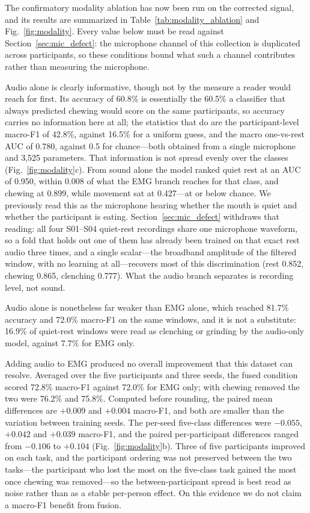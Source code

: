 \documentclass[pdflatex,sn-nature,iicol]{sn-jnl}
\begin{document}
The confirmatory modality ablation has now been run on the corrected signal, and its results are summarized in Table~\ref{tab:modality_ablation} and Fig.~\ref{fig:modality}. Every value below must be read against Section~\ref{sec:mic_defect}: the microphone channel of this collection is duplicated across participants, so these conditions bound what such a channel contributes rather than measuring the microphone.

Audio alone is clearly informative, though not by the measure a reader would reach for first. Its accuracy of 60.8\% is essentially the 60.5\% a classifier that always predicted chewing would score on the same participants, so accuracy carries no information here at all; the statistics that do are the participant-level macro-F1 of 42.8\%, against 16.5\% for a uniform guess, and the macro one-vs-rest AUC of 0.780, against 0.5 for chance---both obtained from a single microphone and 3,525 parameters. That information is not spread evenly over the classes (Fig.~\ref{fig:modality}c). From sound alone the model ranked quiet rest at an AUC of 0.950, within 0.008 of what the EMG branch reaches for that class, and chewing at 0.899, while movement sat at 0.427---at or below chance. We previously read this as the microphone hearing whether the mouth is quiet and whether the participant is eating. Section~\ref{sec:mic_defect} withdraws that reading: all four S01--S04 quiet-rest recordings share one microphone waveform, so a fold that holds out one of them has already been trained on that exact rest audio three times, and a single scalar---the broadband amplitude of the filtered window, with no learning at all---recovers most of this discrimination (rest 0.852, chewing 0.865, clenching 0.777). What the audio branch separates is recording level, not sound.

Audio alone is nonetheless far weaker than EMG alone, which reached 81.7\% accuracy and 72.0\% macro-F1 on the same windows, and it is not a substitute: 16.9\% of quiet-rest windows were read as clenching or grinding by the audio-only model, against 7.7\% for EMG only.

Adding audio to EMG produced no overall improvement that this dataset can resolve. Averaged over the five participants and three seeds, the fused condition scored 72.8\% macro-F1 against 72.0\% for EMG only; with chewing removed the two were 76.2\% and 75.8\%. Computed before rounding, the paired mean differences are $+0.009$ and $+0.004$ macro-F1, and both are smaller than the variation between training seeds. The per-seed five-class differences were $-0.055$, $+0.042$ and $+0.039$ macro-F1, and the paired per-participant differences ranged from $-0.106$ to $+0.104$ (Fig.~\ref{fig:modality}b). Three of five participants improved on each task, and the participant ordering was not preserved between the two tasks---the participant who lost the most on the five-class task gained the most once chewing was removed---so the between-participant spread is best read as noise rather than as a stable per-person effect. On this evidence we do not claim a macro-F1 benefit from fusion.
\end{document}
